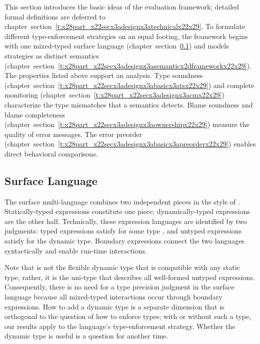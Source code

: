 \documentclass[ twoside,open=right,titlepage,numbers=noenddot,headinclude,%
                footinclude=true,cleardoublepage=empty,abstract=off,
                BCOR=5mm,paper=a4,fontsize=11pt,%
                ngerman,american,%
                parts,pdfspacing]{scrreprt}
\newcommand{\SecRef}[2]{section~#1}
\newcommand{\SecRefLocal}[3]{\hyperref[#1]{\SecRef{#2}{#3}}}
\newcommand{\Ssubsubsection}[2]{\subsubsection[#1]{#2}}
\renewcommand{\Ssubsubsection}[2]{\subsection[#1]{#2}}
\renewcommand{\SecRefLocal}[3]{section~\ref{#1}}
\begin{document}
This section introduces the basic ideas of the evaluation framework;
 detailed formal definitions are deferred to chapter~\SecRefLocal{t:x28part_x22secx3adesignx3atechnicalx22x29}{4.5}{Technical Development}.
To formulate different type{-}enforcement strategies on an equal footing,
 the framework begins with one mixed{-}typed surface language (chapter~\SecRefLocal{t:x28part_x22secx3adesignx3abasicx3asurfacex22x29}{4.4.1}{Surface Language})
 and models strategies as distinct semantics (chapter~\SecRefLocal{t:x28part_x22secx3adesignx3asemanticx2dframeworkx22x29}{4.4.2}{Semantic Framework}).
The properties listed above support an analysis.
Type soundness (chapter~\SecRefLocal{t:x28part_x22secx3adesignx3abasicx3atsx22x29}{4.4.3}{Type Soundness}) and complete monitoring (chapter~\SecRefLocal{t:x28part_x22secx3adesignx3acmx22x29}{4.4.4}{Complete Monitoring})
 characterize the type mismatches that a semantics detects.
Blame soundness and blame completeness (chapter~\SecRefLocal{t:x28part_x22secx3adesignx3aownershipx22x29}{4.4.5}{Blame Soundness, Blame Completeness})
 measure the quality of error messages.
The error preorder (chapter~\SecRefLocal{t:x28part_x22secx3adesignx3abasicx3apreorderx22x29}{4.4.6}{Error Preorder}) enables direct behavioral comparisons.

\Ssubsubsection{Surface Language}{Surface Language}\label{t:x28part_x22secx3adesignx3abasicx3asurfacex22x29}

The surface multi{-}language combines two independent pieces in the
 style of .
Statically{-}typed expressions constitute one piece;
 dynamically{-}typed expressions are the other half.
Technically, these expression languages are identified by two
 judgments: typed expressions  satisfy 
 for some type , and untyped expressions  satisfy
  for the dynamic type.
Boundary expressions connect the two languages syntactically and
 enable run{-}time interactions.

Note that \relax{$\tdyn$} is not the flexible dynamic type that is compatible with
 any static type,
 rather, it is the uni{-}type that describes all well{-}formed untyped
 expressions.
Consequently, there is no need for a type precision judgment in the surface language
 because all mixed{-}typed interactions occur through boundary expressions.
How to add a dynamic type is a separate dimension that is orthogonal to the
 question of how to enforce types; with or without such a type,
 our results apply to the language{'}s type{-}enforcement strategy.
Whether the dynamic type is useful is a question for another time.
\end{document}
